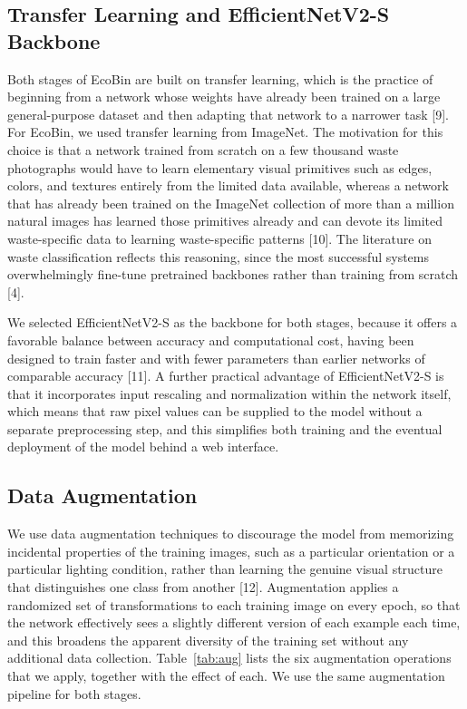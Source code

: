 \documentclass[10pt,twocolumn]{article}
\begin{document}
\subsection{Transfer Learning and EfficientNetV2-S Backbone}
Both stages of EcoBin are built on transfer learning, which is the practice of beginning from a network whose weights have already been trained on a large general-purpose dataset and then adapting that network to a narrower task [9]. For EcoBin, we used transfer learning from ImageNet. The motivation for this choice is that a network trained from scratch on a few thousand waste photographs would have to learn elementary visual primitives such as edges, colors, and textures entirely from the limited data available, whereas a network that has already been trained on the ImageNet collection of more than a million natural images has learned those primitives already and can devote its limited waste-specific data to learning waste-specific patterns [10]. The literature on waste classification reflects this reasoning, since the most successful systems overwhelmingly fine-tune pretrained backbones rather than training from scratch [4].

We selected EfficientNetV2-S as the backbone for both stages, because it offers a favorable balance between accuracy and computational cost, having been designed to train faster and with fewer parameters than earlier networks of comparable accuracy [11]. A further practical advantage of EfficientNetV2-S is that it incorporates input rescaling and normalization within the network itself, which means that raw pixel values can be supplied to the model without a separate preprocessing step, and this simplifies both training and the eventual deployment of the model behind a web interface.

\subsection{Data Augmentation}
We use data augmentation techniques to discourage the model from memorizing incidental properties of the training images, such as a particular orientation or a particular lighting condition, rather than learning the genuine visual structure that distinguishes one class from another [12]. Augmentation applies a randomized set of transformations to each training image on every epoch, so that the network effectively sees a slightly different version of each example each time, and this broadens the apparent diversity of the training set without any additional data collection. Table~\ref{tab:aug} lists the six augmentation operations that we apply, together with the effect of each. We use the same augmentation pipeline for both stages.
\end{document}
